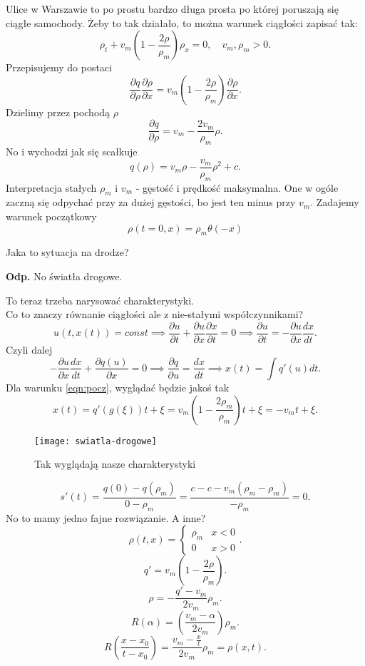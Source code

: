 \documentclass[../main.tex]{subfiles}
\begin{document}
Ulice w Warszawie to po prostu bardzo długa prosta po której poruszają się ciągłe samochody.
Żeby to tak działało, to można warunek ciągłości zapisać tak:
\[
    \rho_t + v_m\left( 1 - \frac{2\rho}{\rho_m} \right) \rho_x = 0,\quad v_m, \rho_m > 0
.\]
Przepisujemy do postaci
\[
    \frac{\partial q}{\partial \rho} \frac{\partial \rho}{\partial x} = v_m \left( 1 - \frac{2\rho}{\rho_m} \right) \frac{\partial \rho}{\partial x}
.\]
Dzielimy przez pochodą $\rho$
 \[
     \frac{\partial q}{\partial \rho} = v_m - \frac{2v_m}{\rho_m}\rho
.\]
No i wychodzi jak się scałkuje
\[
    q(\rho) = v_m \rho - \frac{v_m}{\rho_m}\rho^2 + c
.\]
Interpretacja stałych $\rho_m$ i $v_m$ - gęstość i prędkość maksymalna. One w ogóle zaczną się odpychać przy za dużej gęstości, bo jest ten minus przy $v_m$.
Zadajemy warunek początkowy
\begin{equation}
    \label{eqn:pocz}
    \rho\left( t=0, x \right) = \rho_m \theta(-x)
\end{equation}
\begin{pytanie}
    Jaka to sytuacja na drodze?
\end{pytanie}
\textbf{Odp.} No światła drogowe.

To teraz trzeba narysować charakterystyki.\\
Co to znaczy równanie ciągłości ale z nie-stałymi współczynnikami?
\[
    u(t,x(t)) = const \implies \frac{\partial u}{\partial t} + \frac{\partial u}{\partial x} \frac{\partial x}{\partial t} = 0 \implies \frac{\partial u}{\partial t} = - \frac{\partial u}{\partial x} \frac{dx}{dt}
.\]
Czyli dalej
\[
    -\frac{\partial u}{\partial x} \frac{dx}{dt} + \frac{\partial q(u)}{\partial x} = 0 \implies \frac{\partial q}{\partial u} = \frac{dx}{dt} \implies x(t) = \int q'(u)dt
.\]
Dla warunku \eqref{eqn:pocz}, wyglądać będzie jakoś tak\\
\[
    x(t) = q'(g(\xi))t + \xi = v_m\left( 1 - \frac{2\rho_m}{\rho_m} \right) t + \xi = -v_mt + \xi
.\]
\begin{figure}[h]
    \centering
    \texttt{[image: swiatla-drogowe]}
    \caption{Tak wyglądają nasze charakterystyki}
    \label{fig:swiatla-drogowe}
\end{figure}

\[
    s'(t) = \frac{q(0) - q(\rho_m)}{0 - \rho_m} = \frac{c - c - v_m\left( \rho_m - \rho_m \right) }{-\rho_m} = 0
.\]
No to mamy jedno fajne rozwiązanie.
A inne?
\[
    \rho(t,x) = \begin{cases}
        \rho_m & x <0\\
        0 & x > 0
    \end{cases}
.\]
\[
    q' = v_m (1-\frac{2\rho}{\rho_m})
.\]
\[
    \rho = - \frac{q' - v_m}{2v_m}\rho_m
.\]
\[
    R(\alpha) = \left( \frac{v_m - \alpha}{2v_m} \right) \rho_m
.\]
\[
    R\left( \frac{x-x_0}{t-x_0} \right)  = \frac{v_m - \frac{x}{t}}{2v_m} \rho_m = \rho(x,t)
.\]
\end{document}
